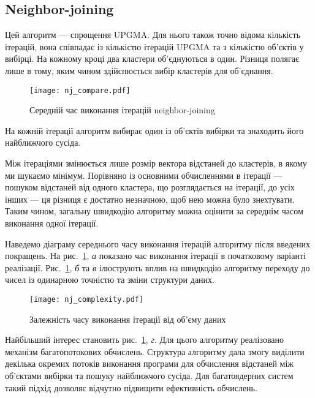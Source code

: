             \subsection{Neighbor-joining}
                Цей алгоритм --- спрощення UPGMA. Для нього також точно відома кількість ітерацій, вона співпадає із кількістю ітерацій UPGMA та з кількістю об’єктів у вибірці. На кожному кроці два кластери об’єднуються в один. Різниця полягає лише в тому, яким чином здійснюється вибір кластерів для об’єднання.
                
                \begin{figure}
                    \centering
                    \texttt{[image: nj\_compare.pdf]}
                    \caption{Середній час виконання ітерацій neighbor-joining}\label{fig:nj_compare}
                \end{figure}
                                
                На кожній ітерації алгоритм вибирає один із об’єктів вибірки та знаходить його найближчого сусіда. 
                
                Між ітераціями змінюється лише розмір вектора відстаней до кластерів, в якому ми шукаємо мінімум. Порівняно із основними обчисленнями в ітерації --- пошуком відстаней від одного кластера, що розглядається на ітерації, до усіх інших --- ця різниця є достатно незначною, щоб нею можна було знехтувати. Таким чином, загальну швидкодію алгоритму можна оцінити за середнім часом виконання одної ітерації.

               
                Наведемо діаграму середнього часу виконання ітерацій алгоритму після введених покращень. На рис.~\ref{fig:nj_compare}, \emph{а} показано час виконання ітерації в початковому варіанті реалізації. Рис.~\ref{fig:nj_compare}, \emph{б} та \emph{в} ілюструють вплив на швидкодію алгоритму переходу до чисел із одинарною точністю та зміни структури даних. 
                
                \begin{figure}
                    \centering
                    \texttt{[image: nj\_complexity.pdf]}
                    \caption{Залежність часу виконання ітерації від об’єму даних}\label{fig:nj_comlexity}
                \end{figure}
                                
                Найбільший інтерес становить рис.~\ref{fig:nj_compare}, \emph{г}. Для цього алгоритму реалізовано механізм багатопотокових обчислень. Структура алгоритму дала змогу виділити декілька окремих потоків виконання програми для обчислення відстаней між об’єктами вибірки та пошуку найближчого сусіда. Для багатоядерних систем такий підхід дозволяє відчутно підвищити ефективність обчислень.

